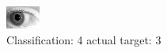 \begin{figure}[h!]
\begin{center}
\includegraphics[width=0.60\columnwidth]{figures/ID324_class_4_target_3.png}
\end{center}
\caption{ Classification: 4 actual target: 3}
\label{fig:ID324_class_4_target_3}
\end{figure}
